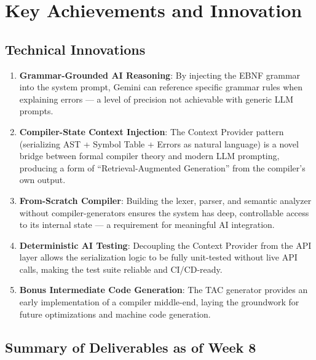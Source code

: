 \documentclass[a4paper,11pt]{article}
\begin{document}
\section{Key Achievements and Innovation}

\subsection{Technical Innovations}

\begin{enumerate}
    \item \textbf{Grammar-Grounded AI Reasoning}: By injecting the EBNF grammar into the system prompt, Gemini can reference specific grammar rules when explaining errors --- a level of precision not achievable with generic LLM prompts.

    \item \textbf{Compiler-State Context Injection}: The Context Provider pattern (serializing AST + Symbol Table + Errors as natural language) is a novel bridge between formal compiler theory and modern LLM prompting, producing a form of ``Retrieval-Augmented Generation'' from the compiler's own output.

    \item \textbf{From-Scratch Compiler}: Building the lexer, parser, and semantic analyzer without compiler-generators ensures the system has deep, controllable access to its internal state --- a requirement for meaningful AI integration.

    \item \textbf{Deterministic AI Testing}: Decoupling the Context Provider from the API layer allows the serialization logic to be fully unit-tested without live API calls, making the test suite reliable and CI/CD-ready.

    \item \textbf{Bonus Intermediate Code Generation}: The TAC generator provides an early implementation of a compiler middle-end, laying the groundwork for future optimizations and machine code generation.
\end{enumerate}

\subsection{Summary of Deliverables as of Week 8}
\end{document}
